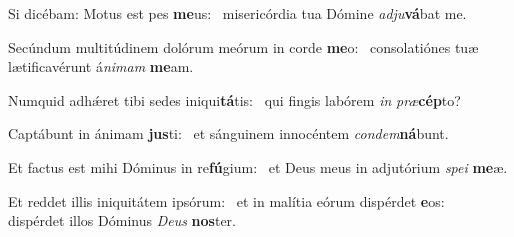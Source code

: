\item Si dicébam: Motus est pes \textbf{me}us:~\psstar{} misericórdia tua Dómine \textit{adju}\textbf{vá}bat me.
\item Secúndum multitúdinem dolórum meórum in corde \textbf{me}o:~\psstar{} consolatiónes tuæ lætificavérunt á\textit{nimam} \textbf{me}am.
\item Numquid adhǽret tibi sedes iniqui\textbf{tá}tis:~\psstar{} qui fingis labórem \textit{in} \textit{præ}\textbf{cép}to?
\item Captábunt in ánimam \textbf{jus}ti:~\psstar{} et sánguinem innocéntem \textit{condem}\textbf{ná}bunt.
\item Et factus est mihi Dóminus in re\textbf{fú}gium:~\psstar{} et Deus meus in adjutórium \textit{spei} \textbf{me}æ.
\item Et reddet illis iniquitátem ipsórum:~\pscross{} et in malítia eórum dispérdet \textbf{e}os:~\psstar{} dispérdet illos Dóminus \textit{Deus} \textbf{nos}ter.
